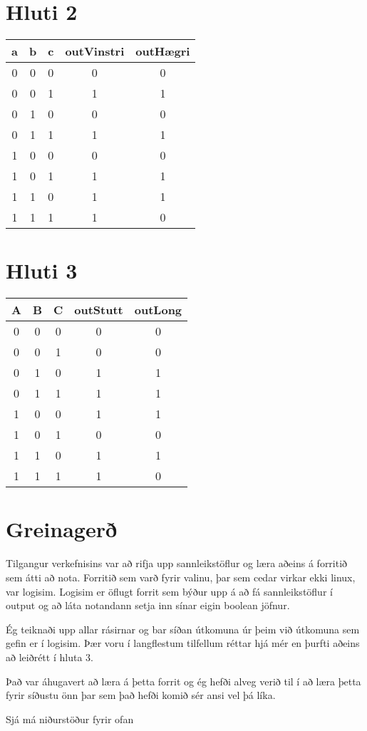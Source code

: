 \documentclass{article}
\begin{document}
\section*{Hluti 2}
\begin{center}
    \begin{tabular}{|c|c|c|c|c|}
        \hline
        a&b&c&outVinstri&outHægri\\
        \hline
        0&0&0&0&0\\
        \hline
        0&0&1&1&1\\
        \hline
        0&1&0&0&0\\
        \hline
        0&1&1&1&1\\
        \hline
        1&0&0&0&0\\
        \hline
        1&0&1&1&1\\
        \hline
        1&1&0&1&1\\
        \hline
        1&1&1&1&0\\
        \hline
    \end{tabular}
\end{center}

\section*{Hluti 3}
\begin{center}
    \begin{tabular}{|c|c|c|c|c|}
        \hline
        A&B&C&outStutt&outLong\\
        \hline
        0&0&0&0&0\\
        \hline
        0&0&1&0&0\\
        \hline
        0&1&0&1&1\\
        \hline
        0&1&1&1&1\\
        \hline
        1&0&0&1&1\\
        \hline
        1&0&1&0&0\\
        \hline
        1&1&0&1&1\\
        \hline
        1&1&1&1&0\\
        \hline

    \end{tabular}
\end{center}

\section*{Greinagerð}
Tilgangur verkefnisins var að rifja upp sannleikstöflur og læra aðeins á forritið sem átti að nota. 
Forritið sem varð fyrir valinu, þar sem cedar virkar ekki linux, var logisim. Logisim er öflugt forrit sem býður upp á 
að fá sannleikstöflur í output og að láta notandann setja inn sínar eigin boolean jöfnur.

Ég teiknaði upp allar rásirnar og bar síðan útkomuna úr þeim við útkomuna sem gefin er í logisim. Þær voru í langflestum tilfellum
réttar hjá mér en þurfti aðeins að leiðrétt í hluta 3.

Það var áhugavert að læra á þetta forrit og ég hefði alveg verið til í að læra þetta fyrir síðustu önn þar sem það hefði
komið sér ansi vel þá líka.

Sjá má niðurstöður fyrir ofan
\end{document}
